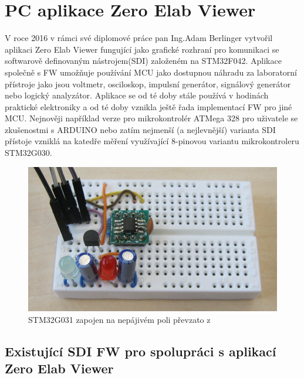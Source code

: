 \section{PC aplikace Zero Elab Viewer}
V roce 2016 v rámci své diplomové práce pan Ing.Adam Berlinger vytvořil aplikaci Zero Elab Viewer fungující jako grafické rozhraní pro komunikaci se softwarově definovaným nástrojem(SDI) založeném na STM32F042. Aplikace společně s FW umožňuje používání MCU jako dostupnou náhradu za laboratorní přístroje  jako jsou voltmetr, osciloskop, impulsní generátor, signálový generátor nebo logický analyzátor. Aplikace se od té doby stále používá v hodinách praktické elektroniky a od té doby vznikla ještě řada implementací FW pro jiné MCU. Nejnověji například verze pro mikrokontrolér ATMega 328 pro uživatele se zkušenostmi s ARDUINO nebo zatím nejmenší (a nejlevnější) varianta SDI přístoje vzniklá na katedře měření využívající 8-pinovou variantu mikrokontroleru STM32G030.\\

\begin{figure}[H]
	\centering
	\includegraphics[width=0.5\linewidth]{Figs/Screenshots/G0_Lab_foto2}
	\caption{STM32G031 zapojen na nepájivém poli převzato z \cite{G030Foto}}
	\label{fig:g0labfoto2}
\end{figure}

\subsection{Existující SDI FW pro spolupráci s aplikací Zero Elab Viewer}

